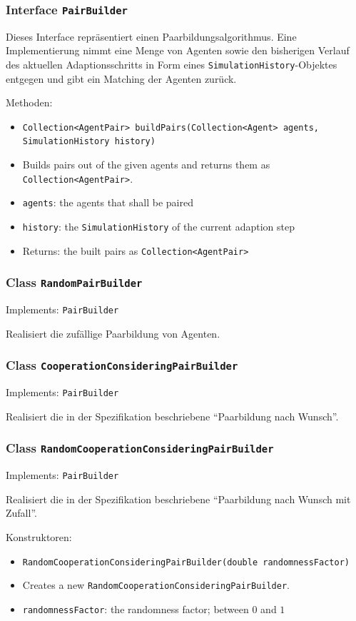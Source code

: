 \documentclass[parskip=full,11pt]{scrartcl}
\begin{document}
\subsubsection{Interface \texttt{PairBuilder}}
Dieses Interface repräsentiert einen Paarbildungsalgorithmus. Eine Implementierung nimmt eine Menge von Agenten sowie den bisherigen Verlauf des aktuellen Adaptionsschritts in Form eines \texttt{SimulationHistory}-Objektes entgegen und gibt ein Matching der Agenten zurück.

Methoden:
\begin{itemize}\itemsep -10pt
\item \texttt{Collection<AgentPair> buildPairs(Collection<Agent> agents, SimulationHistory history)}
\item[] Builds pairs out of the given agents and returns them as \texttt{Collection<AgentPair>}.
\item[] \texttt{agents}: the agents that shall be paired
\item[] \texttt{history}: the \texttt{SimulationHistory} of the current adaption step
\item[] Returns: the built pairs as \texttt{Collection<AgentPair>}
\end{itemize}

\subsubsection{Class \texttt{RandomPairBuilder}}
Implements: \texttt{PairBuilder}

Realisiert die zufällige Paarbildung von Agenten.

\subsubsection{Class \texttt{CooperationConsideringPairBuilder}}
Implements: \texttt{PairBuilder}

Realisiert die in der Spezifikation beschriebene \enquote{Paarbildung nach Wunsch}.

\subsubsection{Class \texttt{RandomCooperationConsideringPairBuilder}}
Implements: \texttt{PairBuilder}

Realisiert die in der Spezifikation beschriebene \enquote{Paarbildung nach Wunsch mit Zufall}.

Konstruktoren:
\begin{itemize}\itemsep -10pt
\item \texttt{RandomCooperationConsideringPairBuilder(double randomnessFactor)}
\item[] Creates a new \texttt{RandomCooperationConsideringPairBuilder}.
\item[] \texttt{randomnessFactor}: the randomness factor; between \(0\) and \(1\)
\end{itemize}
\end{document}
